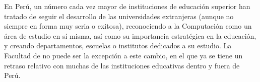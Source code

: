 En Perú, un número cada vez mayor de instituciones de educación superior han 
tratado de seguir el desarrollo de las universidades extranjeras (aunque no siempre en 
forma muy seria o exitosa), reconociendo a la Computación como un área de estudio 
en sí misma, así como su importancia estratégica en la educación, y creando 
departamentos, escuelas o institutos dedicados a su estudio. La Facultad de \FacultadName 
no puede ser la excepción a este cambio, en el que ya se tiene un retraso relativo con 
muchas de las instituciones educativas dentro y fuera de Perú.
